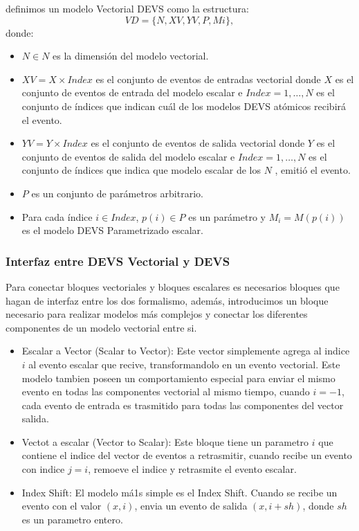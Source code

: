 \documentclass[a4paper,	11pt]{report}
\begin{document}
definimos un modelo Vectorial DEVS como la estructura:
\begin{equation}
V D = \{N, XV, Y V, P, {M i }\},
\end{equation}
donde:
\begin{itemize}
\item $N \in N$ es la dimensión del modelo vectorial.

\item $XV = X \times Index$ es el conjunto de eventos de entradas vectorial donde $X$ es el conjunto de eventos de entrada del modelo escalar e $Index = {1, \ldots , N }$ es el conjunto de índices que indican cuál de los modelos DEVS atómicos recibirá el evento.

\item $YV = Y \times Index$ es el conjunto de eventos de salida vectorial donde $Y$ es el conjunto de eventos de salida del modelo escalar e $Index = {1, \ldots , N }$ es el conjunto de índices que indica que modelo escalar de los $N$ , emitió el evento. 

\item $P$ es un conjunto de parámetros arbitrario.

\item Para cada índice $i \in Index$, $p(i) \in P$ es un parámetro y $M_i = M (p(i))$ es el modelo DEVS Parametrizado escalar.
\end{itemize}

\subsubsection{Interfaz entre DEVS Vectorial y DEVS}
Para conectar bloques vectoriales y bloques escalares es necesarios bloques que hagan de interfaz entre los dos formalismo, además, introducimos un bloque necesario para realizar modelos más complejos y conectar los diferentes componentes de un modelo vectorial entre si.

\begin{itemize}
 \item Escalar a Vector (Scalar to Vector): Este vector simplemente agrega al indice $i$ al evento escalar que recive, transformandolo en un evento vectorial. Este modelo tambien poseen un comportamiento especial para enviar el mismo evento en todas las componentes vectorial al mismo tiempo, cuando $i = -1$, cada evento de entrada es trasmitido para todas las componentes del vector salida.
 \item Vectot a escalar (Vector to Scalar): Este bloque tiene un parametro $i$ que contiene el indice del vector de eventos a retrasmitir, cuando recibe un evento con indice $j=i$, remoeve el indice y retrasmite el evento escalar.
  \item Index Shift: El modelo má1s simple es el Index Shift. Cuando se recibe un evento con el valor $(x,i)$, envia un evento de salida $(x, i+sh)$, donde $sh$ es un parametro entero.

\end{itemize}
\end{document}

